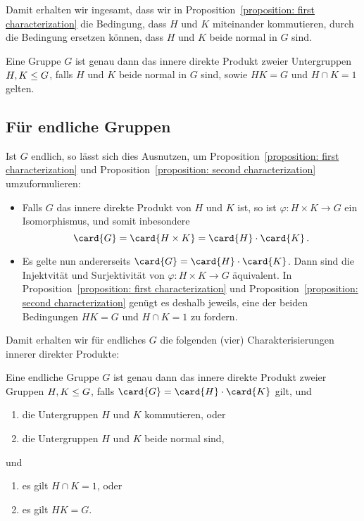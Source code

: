 Damit erhalten wir ingesamt, dass wir in Proposition~\ref{proposition: first characterization} die Bedingung, dass $H$ und $K$ miteinander kommutieren, durch die Bedingung ersetzen können, dass $H$ und $K$ beide normal in $G$ sind.

\begin{proposition}
  \label{proposition: second characterization}
  Eine Gruppe $G$ ist genau dann das innere direkte Produkt zweier Untergruppen $H, K \leq G$, falls $H$ und $K$ beide normal in $G$ sind, sowie $HK = G$ und $H \cap K = 1$ gelten.
\end{proposition}





\subsection*{Für endliche Gruppen}

Ist $G$ endlich, so lässt sich dies Ausnutzen, um Proposition~\ref{proposition: first characterization} und Proposition~\ref{proposition: second characterization} umzuformulieren:

\begin{itemize}
  \item
    Falls $G$ das innere direkte Produkt von $H$ und $K$ ist, so ist $\varphi \colon H \times K \to G$ ein Isomorphismus, und somit inbesondere
    \[
        \card{G}
      = \card{H \times K}
      = \card{H} \cdot \card{K} \,.
    \]
  \item
    Es gelte nun andererseits $\card{G} = \card{H} \cdot \card{K}$.
    Dann sind die Injektvität und Surjektivität von $\varphi \colon H \times K \to G$ äquivalent.
    In Proposition~\ref{proposition: first characterization} und Proposition~\ref{proposition: second characterization} genügt es deshalb jeweils, eine der beiden Bedingungen $HK = G$ und $H \cap K = 1$ zu fordern.
\end{itemize}

Damit erhalten wir für endliches $G$ die folgenden (vier) Charakterisierungen innerer direkter Produkte:

\begin{proposition}
  Eine endliche Gruppe $G$ ist genau dann das innere direkte Produkt zweier Gruppen $H, K \leq G$, falls $\card{G} = \card{H} \cdot \card{K}$ gilt, und
  \begin{enumerate}
    \item
      die Untergruppen $H$ und $K$ kommutieren, oder
    \item
      die Untergruppen $H$ und $K$ beide normal sind,
  \end{enumerate}
  und
  \begin{enumerate}[label=\arabic*'.]
    \item
      es gilt $H \cap K = 1$, oder
    \item
      es gilt $H K = G$.
  \end{enumerate}
\end{proposition}

